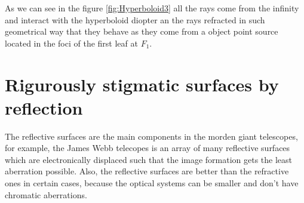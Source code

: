                 As we can see in the figure \ref{fig:Hyperboloid3} all the rays come from the infinity and interact with the hyperboloid diopter an the rays refracted in such geometrical way that they behave as they come from a object point source located in the foci of the first leaf at $F_1$.
                
        \section{Rigurously stigmatic surfaces by reflection}
                
                The reflective surfaces are the main components in the morden giant telescopes, for example, the James Webb telecopes is an array of many reflective surfaces which are electronically displaced such that the image formation gets the least aberration possible. Also, the reflective surfaces are better than the refractive ones in certain cases, because the optical systems can be smaller and don't have chromatic aberrations.

